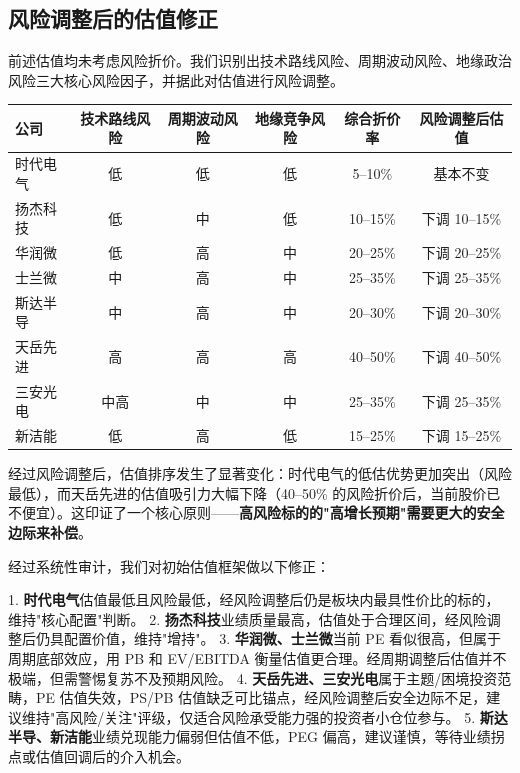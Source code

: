 \subsection{风险调整后的估值修正}

前述估值均未考虑风险折价。我们识别出技术路线风险、周期波动风险、地缘政治风险三大核心风险因子，并据此对估值进行风险调整。

\begin{exhibitbox}[表 7-12：风险因子评估与估值折价修正]
\centering
\small
\begin{tabularx}{\textwidth}{X c c c c c}
\toprule
\textbf{公司} & \textbf{技术路线风险} & \textbf{周期波动风险} & \textbf{地缘竞争风险} & \textbf{综合折价率} & \textbf{风险调整后估值} \\
\midrule
\rowcolor{riskgreen!10}
时代电气 & 低 & 低 & 低 & 5–10\% & 基本不变 \\
\rowcolor{riskgreen!10}
扬杰科技 & 低 & 中 & 低 & 10–15\% & 下调 10–15\% \\
\rowcolor{riskamber!10}
华润微 & 低 & 高 & 中 & 20–25\% & 下调 20–25\% \\
\rowcolor{riskamber!10}
士兰微 & 中 & 高 & 中 & 25–35\% & 下调 25–35\% \\
\rowcolor{riskamber!10}
斯达半导 & 中 & 高 & 中 & 20–30\% & 下调 20–30\% \\
\rowcolor{riskred!10}
天岳先进 & 高 & 高 & 高 & 40–50\% & 下调 40–50\% \\
\rowcolor{riskred!10}
三安光电 & 中高 & 中 & 中 & 25–35\% & 下调 25–35\% \\
\rowcolor{riskamber!10}
新洁能 & 低 & 高 & 低 & 15–25\% & 下调 15–25\% \\
\bottomrule
\end{tabularx}
\end{exhibitbox}

经过风险调整后，估值排序发生了显著变化：时代电气的低估优势更加突出（风险最低），而天岳先进的估值吸引力大幅下降（40–50\% 的风险折价后，当前股价已不便宜）。这印证了一个核心原则——\textbf{高风险标的的"高增长预期"需要更大的安全边际来补偿}。

\begin{keyinsight}[估值审计核心结论]
经过系统性审计，我们对初始估值框架做以下修正：

1. \textbf{时代电气}估值最低且风险最低，经风险调整后仍是板块内最具性价比的标的，维持"核心配置"判断。
2. \textbf{扬杰科技}业绩质量最高，估值处于合理区间，经风险调整后仍具配置价值，维持"增持"。
3. \textbf{华润微、士兰微}当前 PE 看似很高，但属于周期底部效应，用 PB 和 EV/EBITDA 衡量估值更合理。经周期调整后估值并不极端，但需警惕复苏不及预期风险。
4. \textbf{天岳先进、三安光电}属于主题/困境投资范畴，PE 估值失效，PS/PB 估值缺乏可比锚点，经风险调整后安全边际不足，建议维持"高风险/关注"评级，仅适合风险承受能力强的投资者小仓位参与。
5. \textbf{斯达半导、新洁能}业绩兑现能力偏弱但估值不低，PEG 偏高，建议谨慎，等待业绩拐点或估值回调后的介入机会。
\end{keyinsight}
